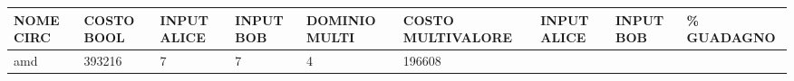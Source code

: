 \documentclass[
]{book}
\begin{document}
\begin{longtable}[]{@{}lllllllll@{}}
\toprule
\begin{minipage}[b]{0.07\columnwidth}\raggedright
NOME CIRC\strut
\end{minipage} & \begin{minipage}[b]{0.11\columnwidth}\raggedright
COSTO BOOL\strut
\end{minipage} & \begin{minipage}[b]{0.08\columnwidth}\raggedright
INPUT ALICE\strut
\end{minipage} & \begin{minipage}[b]{0.07\columnwidth}\raggedright
INPUT BOB\strut
\end{minipage} & \begin{minipage}[b]{0.09\columnwidth}\raggedright
DOMINIO MULTI\strut
\end{minipage} & \begin{minipage}[b]{0.12\columnwidth}\raggedright
COSTO MULTIVALORE\strut
\end{minipage} & \begin{minipage}[b]{0.08\columnwidth}\raggedright
INPUT ALICE\strut
\end{minipage} & \begin{minipage}[b]{0.07\columnwidth}\raggedright
INPUT BOB\strut
\end{minipage} & \begin{minipage}[b]{0.07\columnwidth}\raggedright
\% GUADAGNO\strut
\end{minipage}\tabularnewline
\midrule
\endhead
\begin{minipage}[t]{0.07\columnwidth}\raggedright
amd\strut
\end{minipage} & \begin{minipage}[t]{0.11\columnwidth}\raggedright
393216\strut
\end{minipage} & \begin{minipage}[t]{0.08\columnwidth}\raggedright
7\strut
\end{minipage} & \begin{minipage}[t]{0.07\columnwidth}\raggedright
7\strut
\end{minipage} & \begin{minipage}[t]{0.09\columnwidth}\raggedright
4\strut
\end{minipage} & \begin{minipage}[t]{0.12\columnwidth}\raggedright
196608\strut
\end{minipage} & \begin{minipage}[t]{0.08\columnwidth}\raggedright

\end{minipage}
\end{longtable}
\end{document}
